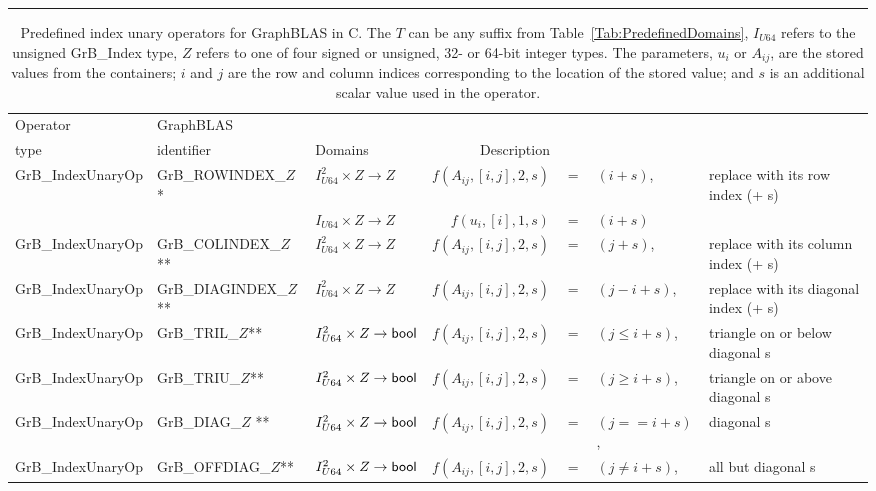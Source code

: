 \begin{landscape}

\begin{table}
\hspace{-2.5em}\begin{threeparttable}
\hrule
\vspace{1\baselineskip}
\caption{Predefined index unary operators for GraphBLAS in C.  The $T$ can 
be any suffix from Table~\ref{Tab:PredefinedDomains}, $I_{U64}$ refers to the unsigned 
{\sf GrB\_Index} type, $Z$ refers to one of four signed or unsigned, 32- or 64-bit integer types.  
The parameters, $u_i$ or $A_{ij}$, are the stored values from the containers; $i$ 
and $j$ are the row and column indices corresponding to the location of the stored value;
and $s$ is an additional scalar value used in the operator.}
\label{Tab:PredefIndexOperators}
\vspace{1\baselineskip}

\begin{tabular}{l|l|l|rcll}
Operator & GraphBLAS             &                                                      & \\
type     & identifier            & Domains                                              & Description \\ \hline
{\sf GrB\_IndexUnaryOp}   & {\sf GrB\_ROWINDEX\_$Z$}*  & $I_{U64}^2 \times Z \rightarrow Z$ & $f(A_{ij},[i,j],2,s)$ & $=$ & $(i + s)$, & replace with its row index (+ s) \\
                          &                            & $I_{U64} \times Z \rightarrow Z$ & $f(u_{i},[i],1,s)$ & $=$ & $(i + s)$ \\
{\sf GrB\_IndexUnaryOp}   & {\sf GrB\_COLINDEX\_$Z$}**   & $I_{U64}^2 \times Z \rightarrow Z$ & $f(A_{ij},[i,j],2,s)$ & $=$ & $(j + s)$, & replace with its column index (+ s) \\
{\sf GrB\_IndexUnaryOp}   & {\sf GrB\_DIAGINDEX\_$Z$}**  & $I_{U64}^2 \times Z \rightarrow Z$ & $f(A_{ij},[i,j],2,s)$ & $=$ & $(j - i + s)$, & replace with its diagonal index (+ s) \\
\hline

{\sf GrB\_IndexUnaryOp}   & {\sf GrB\_TRIL\_$Z$}**       & $I_{U64}^2 \times Z \rightarrow {\sf bool}$ & $f(A_{ij},[i,j],2,s)$ & $=$ & $(j \leq i + s)$, & triangle on or below diagonal s \\
{\sf GrB\_IndexUnaryOp}   & {\sf GrB\_TRIU\_$Z$}**       & $I_{U64}^2 \times Z \rightarrow {\sf bool}$ & $f(A_{ij},[i,j],2,s)$ & $=$ & $(j \geq i + s)$, & triangle on or above diagonal s \\
{\sf GrB\_IndexUnaryOp}   & {\sf GrB\_DIAG\_$Z$} **      & $I_{U64}^2 \times Z \rightarrow {\sf bool}$ & $f(A_{ij},[i,j],2,s)$ & $=$ & $(j == i + s)$, & diagonal s \\
{\sf GrB\_IndexUnaryOp}   & {\sf GrB\_OFFDIAG\_$Z$}**    & $I_{U64}^2 \times Z \rightarrow {\sf bool}$ & $f(A_{ij},[i,j],2,s)$ & $=$ & $(j \neq i + s)$, & all but diagonal s \\


\end{tabular}
\end{threeparttable}
\end{table}
\end{landscape}
